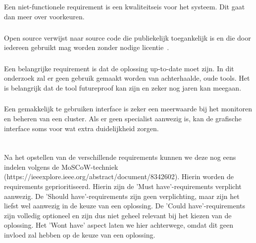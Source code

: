 \subsection{}
\label{subsec:Niet-functionele Requirements}
Een niet-functionele requirement is een kwaliteitseis voor het systeem. Dit gaat dan meer over voorkeuren.

\subsubsection{}
\label{subsubsec:Open source}
Open source verwijst naar source code die publiekelijk toegankelijk is en die door iedereen gebruikt mag worden zonder nodige licentie~\autocite{2021c}. %

\subsubsection{}
\label{subsubsec:Anno 2020-2021}
Een belangrijke requirement is dat de oplossing up-to-date moet zijn. In dit onderzoek zal er geen gebruik gemaakt worden van achterhaalde, oude tools. Het is belangrijk dat de tool futureproof kan zijn en zeker nog jaren kan meegaan.

\subsubsection{}
\label{subsubsec:Grafische interface}
Een gemakkelijk te gebruiken interface is zeker een meerwaarde bij het monitoren en beheren van een cluster. Als er geen specialist aanwezig is, kan de grafische interface soms voor wat extra duidelijkheid zorgen.


\section{}
\label{sec:Indelen requirements volgens MoSCoW-techniek}

Na het opstellen van de verschillende requirements kunnen we deze nog eens indelen volgens de MoSCoW-techniek (https://ieeexplore.ieee.org/abstract/document/8342602). Hierin worden de requirements geprioritiseerd. Hierin zijn de 'Must have'-requirements verplicht aanwezig. De 'Should have'-requirements zijn geen verplichting, maar zijn het liefst wel aanwezig in de keuze van een oplossing. De 'Could have'-requirements zijn volledig optioneel en zijn dus niet geheel relevant bij het kiezen van de oplossing. Het 'Wont have' aspect laten we hier achterwege, omdat dit geen invloed zal hebben op de keuze van een oplossing.

